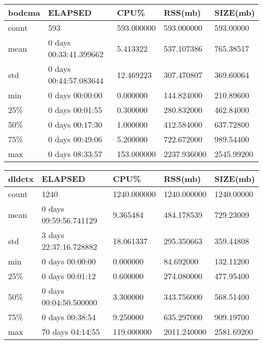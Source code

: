 \documentclass{article}
\begin{document}
\begin{table}[H]
\begin{tabular}{|l|l|l|l|l|}
\hline bodcma& ELAPSED&   CPU\%&  RSS(mb)&   SIZE(mb) \\
\hline count&    593& 593.000000&  593.000000&  593.00000 \\
\hline mean&  0 days 00:33:41.399662&  5.413322&  537.107386&  765.38517 \\
\hline std&  0 days 00:44:57.083644&  12.469223&  307.470807&  369.60064 \\
\hline min&   0 days 00:00:00&  0.000000&  144.824000&  210.89600 \\
\hline 25\%&   0 days 00:01:55&  0.300000&  280.832000&  462.84000 \\
\hline 50\%&   0 days 00:17:30&  1.000000&  412.584000&  637.72800 \\
\hline 75\%&   0 days 00:49:06&  5.200000&  722.672000&  989.54400 \\
\hline max&   0 days 08:33:57& 153.000000& 2237.936000& 2545.99200 \\
\hline 
\end{tabular}
\label{TABLE-SessionSizebodcma}
\end{table}

\begin{table}[H]
\begin{tabular}{|l|l|l|l|l|}
\hline dldctx& ELAPSED&    CPU\%&  RSS(mb)&   SIZE(mb) \\
\hline count&   1240& 1240.000000& 1240.000000& 1240.00000 \\
\hline mean&  0 days 09:59:56.741129&   9.365484&  484.178539&  729.23009 \\
\hline std&  3 days 22:37:16.728882&  18.061337&  295.350663&  359.44808 \\
\hline min&   0 days 00:00:00&   0.000000&  84.692000&  132.11200 \\
\hline 25\%&   0 days 00:01:12&   0.600000&  274.080000&  477.95400 \\
\hline 50\%&  0 days 00:04:50.500000&   3.300000&  343.756000&  568.51400 \\
\hline 75\%&   0 days 00:38:54&   9.250000&  635.297000&  909.19700 \\
\hline max&  70 days 04:14:55&  119.000000& 2011.240000& 2581.69200 \\
\hline 
\end{tabular}
\label{TABLE-SessionSizedldctx}
\end{table}
\end{document}
